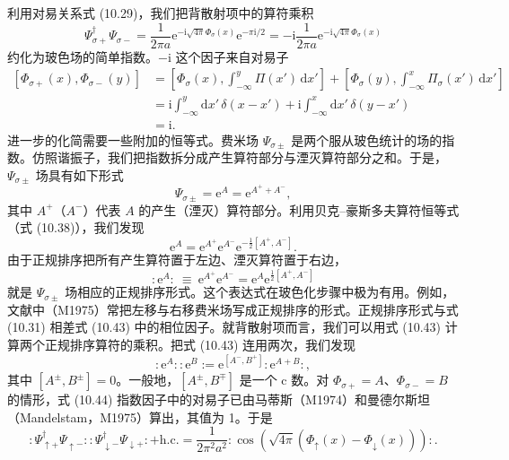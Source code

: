 利用对易关系式 (10.29)，我们把背散射项中的算符乘积
\begin{equation*}
\Psi_{\sigma+}^{\dagger}\Psi_{\sigma-}=\frac{1}{2\pi a}\mathrm{e}^{-\mathrm{i}\sqrt{4\pi}\Phi_{\sigma}(x)}\mathrm{e}^{-\pi\mathrm{i}/2}=-\mathrm{i}\frac{1}{2\pi a}\mathrm{e}^{-\mathrm{i}\sqrt{4\pi}\Phi_{\sigma}(x)}
\tag{10.39}
\end{equation*}
约化为玻色场的简单指数。$-\mathrm{i}$ 这个因子来自对易子
\begin{align*}
\left[\Phi_{\sigma+}(x),\Phi_{\sigma-}(y)\right]&=\left[\Phi_{\sigma}(x),\int_{-\infty}^{y}\Pi(x')\,\mathrm{d}x'\right]+\left[\Phi_{\sigma}(y),\int_{-\infty}^{x}\Pi_{\sigma}(x')\,\mathrm{d}x'\right]\\
&=\mathrm{i}\int_{-\infty}^{y}\mathrm{d}x'\,\delta(x-x')+\mathrm{i}\int_{-\infty}^{x}\mathrm{d}x'\,\delta(y-x')\\
&=\mathrm{i}.
\tag{10.40}
\end{align*}
进一步的化简需要一些附加的恒等式。费米场 $\Psi_{\sigma\pm}$ 是两个服从玻色统计的场的指数。仿照谐振子，我们把指数拆分成产生算符部分与湮灭算符部分之和。于是，$\Psi_{\sigma\pm}$ 场具有如下形式
\begin{equation*}
\Psi_{\sigma\pm}=\mathrm{e}^{A}=\mathrm{e}^{A^{+}+A^{-}},
\tag{10.41}
\end{equation*}
其中 $A^{+}$（$A^{-}$）代表 $A$ 的产生（湮灭）算符部分。利用贝克–豪斯多夫算符恒等式（式 (10.38)），我们发现
\begin{equation*}
\mathrm{e}^{A}=\mathrm{e}^{A^{+}}\mathrm{e}^{A^{-}}\mathrm{e}^{-\frac{1}{2}[A^{+},A^{-}]}.
\tag{10.42}
\end{equation*}
由于正规排序把所有产生算符置于左边、湮灭算符置于右边，
\begin{equation*}
:\mathrm{e}^{A}:\ \equiv\ \mathrm{e}^{A^{+}}\mathrm{e}^{A^{-}}=\mathrm{e}^{A}\mathrm{e}^{\frac{1}{2}[A^{+},A^{-}]}
\tag{10.43}
\end{equation*}
就是 $\Psi_{\sigma\pm}$ 场相应的正规排序形式。这个表达式在玻色化步骤中极为有用。例如，文献中（M1975）常把左移与右移费米场写成正规排序的形式。正规排序形式与式 (10.31) 相差式 (10.43) 中的相位因子。就背散射项而言，我们可以用式 (10.43) 计算两个正规排序算符的乘积。把式 (10.43) 连用两次，我们发现
\begin{equation*}
:\mathrm{e}^{A}::\mathrm{e}^{B}:=\mathrm{e}^{[A^{-},B^{+}]}:\mathrm{e}^{A+B}:,
\tag{10.44}
\end{equation*}
其中 $[A^{\pm},B^{\pm}]=0$。一般地，$[A^{\pm},B^{\mp}]$ 是一个 c 数。对 $\Phi_{\sigma+}=A$、$\Phi_{\sigma-}=B$ 的情形，式 (10.44) 指数因子中的对易子已由马蒂斯（M1974）和曼德尔斯坦（Mandelstam，M1975）算出，其值为 1。于是
\begin{equation*}
:\Psi_{\uparrow+}^{\dagger}\Psi_{\uparrow-}::\Psi_{\downarrow-}^{\dagger}\Psi_{\downarrow+}:+\mathrm{h.c.}=\frac{1}{2\pi^{2}a^{2}}:\cos\left(\sqrt{4\pi}\left(\Phi_{\uparrow}(x)-\Phi_{\downarrow}(x)\right)\right):.
\tag{10.45}
\end{equation*}

